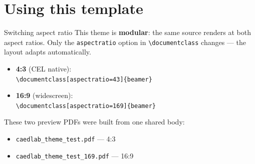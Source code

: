 \section{Using this template}

\begin{frame}[fragile]{Switching aspect ratio}
This theme is \textbf{modular}: the same source renders at both aspect ratios. Only the \texttt{aspectratio} option in \verb|\documentclass| changes --- the layout adapts automatically.

\begin{itemize}
	\item \textbf{4:3} (CEL native):\\ \verb|\documentclass[aspectratio=43]{beamer}|
	\item \textbf{16:9} (widescreen):\\ \verb|\documentclass[aspectratio=169]{beamer}|
\end{itemize}

\vspace{0.5em}
These two preview PDFs were built from one shared body:
\begin{itemize}
	\item \texttt{caedlab\_theme\_test.pdf} --- 4:3
	\item \texttt{caedlab\_theme\_test\_169.pdf} --- 16:9
\end{itemize}
\end{frame}



